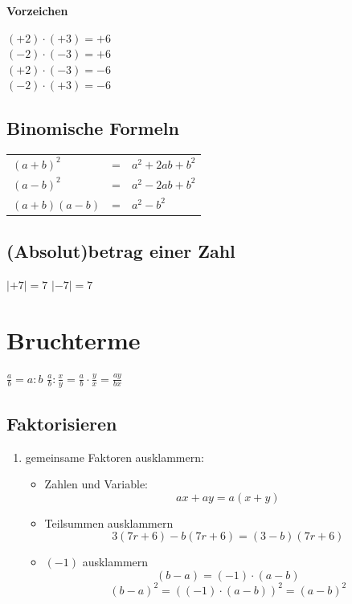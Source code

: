 \begin{multicols}{2}
\textbf{Vorzeichen}

$(+2)\cdot(+3)=+6$\\
$(-2)\cdot(-3)=+6$\\
$(+2)\cdot(-3)=-6$\\
$(-2)\cdot(+3)=-6$\\



\subsection*{Binomische Formeln}
\begin{tabular}{lcl}
 $(a+b)^2$  & =  & $a^2 + 2ab + b^2$ \\
 $(a-b)^2$  & =  & $a^2 - 2ab + b^2$ \\
 $(a+b)(a-b)$  & =  & $a^2 - b^2$ \\

  \end{tabular} 


\subsection*{(Absolut)betrag einer Zahl}

$|+7| = 7$ \hfill $|-7| = 7$

\TRAINER{Intervall-Schreibweise? \zB $a\in[0;1[$}


\forceCB
    \section*{Bruchterme}
    $\frac{a}b = a : b$ \hfill $\frac{a}b : \frac{x}y = \frac{a}b\cdot{}\frac{y}x = \frac{ay}{bx}$
    
\subsection*{Faktorisieren}

\begin{enumerate}
\item gemeinsame Faktoren ausklammern:
\begin{itemize}
\item Zahlen und Variable:
$$ax + ay = a(x+y)$$
\item
Teilsummen ausklammern
$$3(7r+6) - b(7r+6) = (3-b)(7r+6)$$
\item $(-1)$ ausklammern
  $$(b-a)=(-1)\cdot{}(a-b)$$
  $$(b-a)^2 = \left((-1)\cdot{}(a-b)\right)^2 = (a-b)^2$$
\end{itemize}


\end{enumerate}
\end{multicols}
